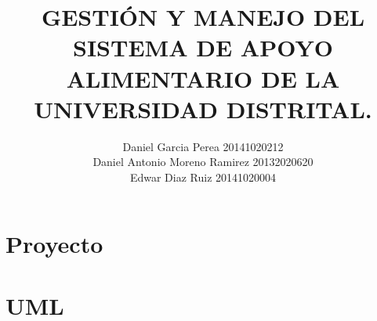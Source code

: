 \documentclass[11pt]{book}
\title{GESTIÓN Y MANEJO DEL SISTEMA DE APOYO ALIMENTARIO DE LA UNIVERSIDAD DISTRITAL.}
\author{Daniel Garcia Perea 20141020212  \\ Daniel Antonio Moreno Ramirez 20132020620  \\ Edwar Diaz Ruiz 20141020004}
\begin{document}
	
	
	
\maketitle
\tableofcontents
\part{Proyecto}


\part{UML}



%
%
%



\end{document}
